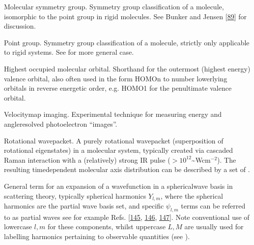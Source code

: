 \documentclass[letterpaper,table,10pt,english]{jupyterBook}
\begin{document}
\begin{description}
\sphinxAtStartPar
Molecular symmetry group. Symmetry group classification of a molecule, isomorphic to the point group in rigid molecules. See Bunker and Jensen {[}\hyperlink{cite.backmatter/bibliography:id547}{89}{]} for discussion.

\sphinxAtStartPar
Point group. Symmetry group classification of a molecule, strictly only applicable to rigid systems. See {\hyperref[\detokenize{backmatter/glossary:term-MS}]{}} for more general case.

\sphinxAtStartPar
Highest occupied molecular orbital. Short\sphinxhyphen{}hand for the outermost (highest energy) valence orbital, also often used in the form HOMO\sphinxhyphen{}n to number lower\sphinxhyphen{}lying orbitals in reverse energetic order, e.g. HOMO\sphinxhyphen{}1 for the penultimate valence orbital.

\sphinxAtStartPar
Velocity\sphinxhyphen{}map imaging. Experimental technique for measuring energy and angle\sphinxhyphen{}resolved photoelectron “images”.

\sphinxAtStartPar
Rotational wavepacket. A purely rotational wavepacket (superposition of rotational eigenstates) in a molecular system, typically created via cascaded Raman interaction with a (relatively) strong IR pulse (\(>10^{12}\)\textasciitilde{}Wcm\(^{-2}\)). The resulting time\sphinxhyphen{}dependent molecular axis distribution can be described by a set of {\hyperref[\detokenize{backmatter/glossary:term-ADMs}]{}}.

\sphinxAtStartPar
General term for an expansion of a wavefunction in a spherical\sphinxhyphen{}wave basis in scattering theory, typically spherical harmonics \(Y_{l,m}\), where the spherical harmonics are the partial wave basis set, and specific \(\psi_{l,m}\) terms can be referred to as partial waves \sphinxhyphen{} see for example Refs. {[}\hyperlink{cite.backmatter/bibliography:id739}{145}, \hyperlink{cite.backmatter/bibliography:id788}{146}, \hyperlink{cite.backmatter/bibliography:id866}{147}{]}. Note conventional use of lower\sphinxhyphen{}case \(l,m\) for these components, whilst upper\sphinxhyphen{}case \(L,M\) are usually used for labelling harmonics pertaining to observable quantities (see {\hyperref[\detokenize{backmatter/glossary:term-anisotropy-paramters}]{}}).


\end{description}
\end{document}
